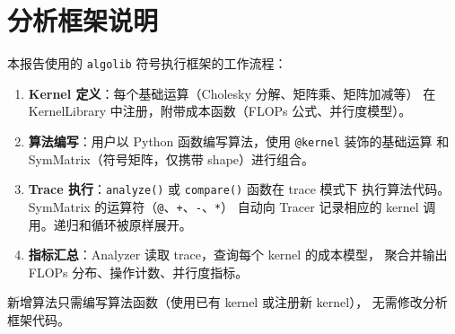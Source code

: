 \documentclass[11pt,a4paper]{ctexart}
\begin{document}
\section{分析框架说明}

本报告使用的 \texttt{algolib} 符号执行框架的工作流程：

\begin{enumerate}[leftmargin=*]
    \item \textbf{Kernel 定义}：每个基础运算（Cholesky 分解、矩阵乘、矩阵加减等）
          在 KernelLibrary 中注册，附带成本函数（FLOPs 公式、并行度模型）。
    \item \textbf{算法编写}：用户以 Python 函数编写算法，使用 \texttt{@kernel} 装饰的基础运算
          和 SymMatrix（符号矩阵，仅携带 shape）进行组合。
    \item \textbf{Trace 执行}：\texttt{analyze()} 或 \texttt{compare()} 函数在 trace 模式下
          执行算法代码。SymMatrix 的运算符（\texttt{@}、\texttt{+}、\texttt{-}、\texttt{*}）
          自动向 Tracer 记录相应的 kernel 调用。递归和循环被原样展开。
    \item \textbf{指标汇总}：Analyzer 读取 trace，查询每个 kernel 的成本模型，
          聚合并输出 FLOPs 分布、操作计数、并行度指标。
\end{enumerate}

\noindent 新增算法只需编写算法函数（使用已有 kernel 或注册新 kernel），
无需修改分析框架代码。
\end{document}
